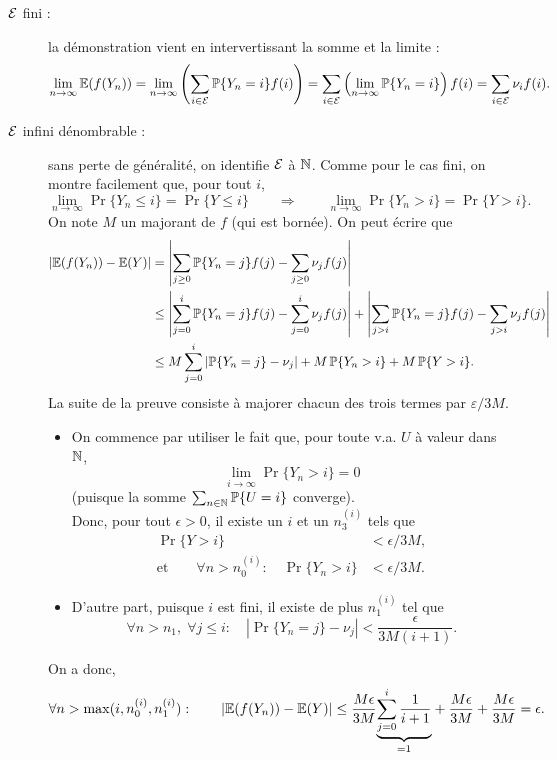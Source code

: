 \proof 
\begin{description}
  \item[$\mathcal{E}$ fini :] la démonstration vient en intervertissant la somme et la limite : 
  $$
  \lim_{n \rightarrow \infty} \operatorname{\mathbb{E}}(f(Y_n)) 
  = \lim_{n \rightarrow \infty} \left(\sum_{i \in \mathcal{E}} \operatorname{\mathbb{P}}\{Y_n = i\} f(i)\right)
  = \sum_{i \in \mathcal{E}} \left(\lim_{n \rightarrow \infty} \operatorname{\mathbb{P}}\{Y_n = i\} \right) f(i) 
  = \sum_{i \in \mathcal{E}} \nu_i f(i).
  $$
  \item[$\mathcal{E}$ infini dénombrable :] sans perte de généralité, on identifie $\mathcal{E}$ à $\mathbb{N}$. Comme pour le cas fini, on montre facilement que, pour tout $i$,
  $$
  \lim_{n \rightarrow \infty} \Pr\{Y_n \leq i\} = \Pr\{Y \leq i\}
  \qquad \Rightarrow \qquad 
  \lim_{n \rightarrow \infty} \Pr\{Y_n > i\} = \Pr\{Y > i\}.
  $$
  On note $M$ un majorant de $f$ (qui est bornée). On peut écrire que
  \begin{align*}
    \left|\operatorname{\mathbb{E}}(f(Y_n)) - \operatorname{\mathbb{E}}(Y)\right|
    & = \left|\sum_{j \geq 0} \operatorname{\mathbb{P}}\{Y_n=j\} f(j) - \sum_{j \geq 0} \nu_j f(j)\right| \\
    & \leq \left|\sum_{j=0}^i \operatorname{\mathbb{P}}\{Y_n=j\} f(j) - \sum_{j=0}^i \nu_j f(j)\right|
    + \left|\sum_{j > i} \operatorname{\mathbb{P}}\{Y_n=j\} f(j) - \sum_{j > i} \nu_j f(j)\right| \\
    & \leq M \sum_{j=0}^i \left|\operatorname{\mathbb{P}}\{Y_n=j\} - \nu_j\right| + M \operatorname{\mathbb{P}}\{Y_n > i\} + M \operatorname{\mathbb{P}}\{Y > i\}.
  \end{align*}
  La suite de la preuve consiste à majorer chacun des trois termes par $\varepsilon/3M$. 
  \begin{itemize}
  \item On commence par utiliser le fait que, pour toute v.a. $U$ à valeur dans $\mathbb{N}$, 
  $$
  \lim_{i \to \infty} \Pr\{Y_n > i\} = 0
  $$
  (puisque la somme $\sum_{n \in \mathbb{N}} \operatorname{\mathbb{P}}\{U = i\}$ converge). \\
  Donc, pour tout $\epsilon > 0$, il existe un $i$ et un $n_3^{(i)}$ tels que 
  \begin{align*}
  \Pr\{Y > i\} & < \epsilon / 3M, \\
  \text{et} \qquad 
  \forall n > n_0^{(i)}: \quad \Pr\{Y_n > i\} & < \epsilon / 3M.
  \end{align*}
  \item D'autre part, puisque $i$ est fini, il existe de plus $n_1^{(i)}$ tel que 
  $$
  \forall n > n_1, \; \forall j \leq i: \quad \left|\Pr\{Y_n=j\} - \nu_j\right| < \frac\epsilon{3M(i+1)}.
  $$
  \end{itemize}
  On a donc, 
 \begin{align*}
   \forall n > \max(i, n_0^{(i)}, n_1^{(i)}): \qquad 
   \left|\operatorname{\mathbb{E}}(f(Y_n)) - \operatorname{\mathbb{E}}(Y)\right| \leq \frac{M\epsilon}{3M} \underset{=1}{\underbrace{\sum_{j=0}^i \frac1{i+1}}} + \frac{M\epsilon}{3M} + \frac{M\epsilon}{3M} = \epsilon.
  \end{align*}
\end{description}
\eproof

